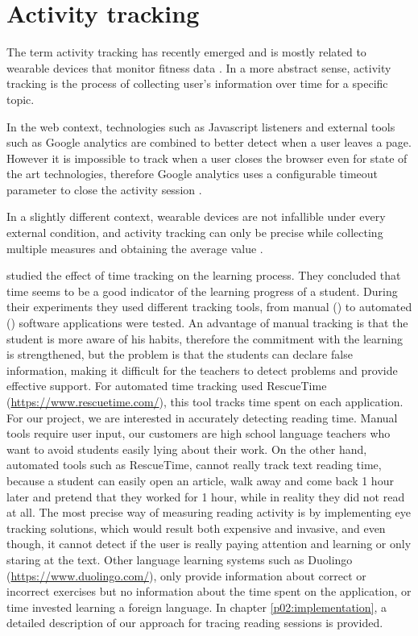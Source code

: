 \chapter{Activity tracking}

The term activity tracking has recently emerged and is mostly related to wearable devices that monitor fitness data \cite{Wikipedia2016}. In a more abstract sense, activity tracking is the process of collecting user's information over time for a specific topic. 

In the web context, technologies such as Javascript listeners and external tools such as Google analytics are combined to better detect when a user leaves a page. However it is impossible to track when a user closes the browser even for state of the art technologies, therefore Google analytics uses a configurable timeout parameter to close the activity session \cite{Pierstorff2014}.

In a slightly different context, wearable devices \cite{Evenson2015} are not infallible under every external condition, and activity tracking can only be precise while collecting multiple measures and obtaining the average value \cite{El-Amrawy2015}.

\citeauthor{Santos2012} studied the effect of time tracking on the learning process. They concluded that time seems to be a good indicator of the learning progress of a student. During their experiments they used different tracking tools, from manual () to automated () software applications were tested. An advantage of manual tracking is that the student is more aware of his habits, therefore the commitment with the learning is strengthened, but the problem is that the students can declare false information, making it difficult for the teachers to detect problems and provide effective support. For automated time tracking \citeauthor{Santos2012} used RescueTime (\url{https://www.rescuetime.com/}), this tool tracks time spent on each application. 
For our project, we are interested in accurately detecting reading time. Manual tools require user input, our customers are high school language teachers who want to avoid students easily lying about their work. On the other hand, automated tools such as RescueTime, cannot really track text reading time, because a student can easily open an article, walk away and come back 1 hour later and pretend that they worked for 1 hour, while in reality they did not read at all. The most precise way of measuring reading activity is by implementing eye tracking solutions, which would result both expensive and invasive, and even though, it cannot detect if the user is really paying attention and learning or only staring at the text.
Other language learning systems such as Duolingo (\url{https://www.duolingo.com/}), only provide information about correct or incorrect exercises but no information about the time spent on the application, or time invested learning a foreign language.
In chapter \ref{p02:implementation}, a detailed description of our approach for tracing reading sessions is provided.